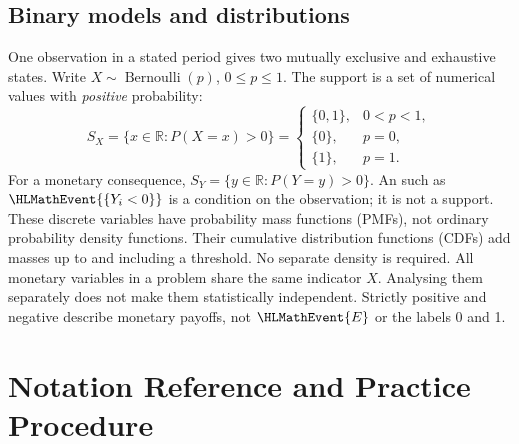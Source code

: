 \subsection{Binary models and distributions}
One observation in a stated period gives two mutually exclusive and exhaustive
states. Write $X\sim\operatorname{Bernoulli}(p)$, $0\leq p\leq1$.
The support is a set of numerical values with \emph{positive} probability:
\[
 S_X=\{x\in\mathbb R:P(X=x)>0\}
 =\begin{cases}\{0,1\},&0<p<1,\\\{0\},&p=0,\\\{1\},&p=1.\end{cases}
\]
For a monetary consequence, $S_Y=\{y\in\mathbb R:P(Y=y)>0\}$.
An  such as $\HLMathEvent{\{Y_i<0\}}$ is a condition on the observation; it is not a support.
These discrete variables have probability mass functions (PMFs), not ordinary
probability density functions. Their cumulative distribution functions (CDFs)
add masses up to and including a threshold. No separate density is required.
All monetary variables in a problem share the same indicator $X$.
Analysing them separately does not make them statistically independent.
Strictly positive and negative describe monetary payoffs, not $\HLMathEvent{E}$ or the labels 0 and 1.

\clearpage\section{Notation Reference and Practice Procedure}\label{sec:t2-c3-notation}
